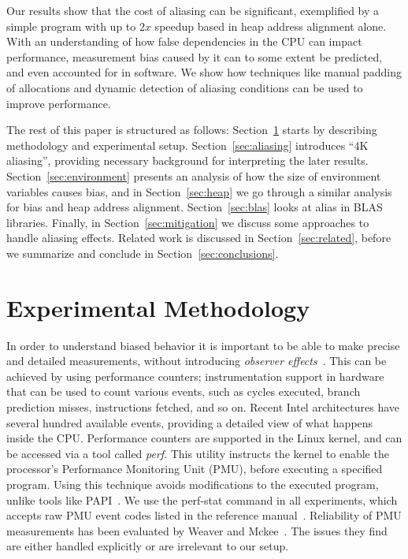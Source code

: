 \documentclass[10pt, conference, compsocconf]{IEEEtran}
\begin{document}
Our results show that the cost of aliasing can be significant, exemplified by a simple program with up to $2x$ speedup based in heap address alignment alone.
With an understanding of how false dependencies in the CPU can impact performance, measurement bias caused by it can to some extent be predicted, and even accounted for in software.
We show how techniques like manual padding of allocations and dynamic detection of aliasing conditions can be used to improve performance. 

The rest of this paper is structured as follows:
Section~\ref{sec:methodology} starts by describing methodology and experimental setup.
Section~\ref{sec:aliasing} introduces ``4K aliasing'', providing necessary background for interpreting the later results.
Section~\ref{sec:environment} presents an analysis of how the size of environment variables causes bias, and in Section~\ref{sec:heap} we go through a similar analysis for bias and heap address alignment.
Section~\ref{sec:blas} looks at alias in BLAS libraries.
Finally, in Section~\ref{sec:mitigation} we discuss some approaches to handle aliasing effects.
Related work is discussed in Section~\ref{sec:related}, before we summarize and conclude in Section~\ref{sec:conclusions}.

\section{Experimental Methodology}
\label{sec:methodology}
In order to understand biased behavior it is important to be able to make precise and detailed measurements, without introducing \emph{observer effects}~\cite{Mytkowicz:2008:OE&MB}.
This can be achieved by using performance counters; instrumentation support in hardware that can be used to count various events, such as cycles executed, branch prediction misses, instructions fetched, and so on.
Recent Intel architectures have several hundred available events, providing a detailed view of what happens inside the CPU.
Performance counters are supported in the Linux kernel, and can be accessed via a tool called \emph{perf}.
This utility instructs the kernel to enable the processor's Performance Monitoring Unit (PMU), before executing a specified program.
Using this technique avoids modifications to the executed program, unlike tools like PAPI~\cite{PAPI:PortableInterface}.
We use the perf-stat command in all experiments, which accepts raw PMU event codes listed in the reference manual~\cite{Volume3B}.
Reliability of PMU measurements has been evaluated by Weaver and Mckee~\cite{Weaver:2008:PCTrusted}.
The issues they find are either handled explicitly or are irrelevant to our setup.
\end{document}
